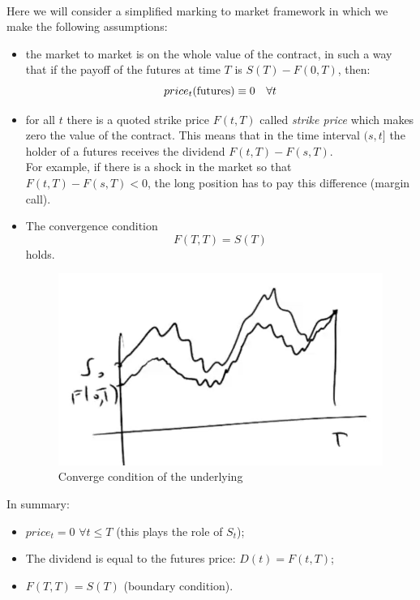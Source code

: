 \\
Here we will consider a simplified marking to market framework in which we make the following assumptions:
\begin{itemize}
    \item the market to market is on the whole value of the contract, in such a way that if the payoff of the futures at time $T$ is $S(T)-F(0,T)$, then:
    \begin{equation*}
        price_t(\operatorname{futures}) \equiv 0 \quad\forall t
    \end{equation*} %
    \item for all $t$ there is a quoted strike price $F(t,T)$ called \emph{strike price} which makes zero the value of the contract. This means that in the time interval $(s,t]$ the holder of a futures receives the dividend $F(t,T) - F(s,T)$.\\
    For example, if there is a shock in the market so that $F(t,T) - F(s,T) < 0$, the long position has to pay this difference (margin call).
    \item The convergence condition
    \begin{equation}
        F(T,T) = S(T)
    \end{equation}
    holds.
    \begin{figure}[h]
        \centering
        \includegraphics[scale=0.32]{fig/tmp/fig32.png}
        \caption{Converge condition of the underlying}
        \label{fig:concond}
    \end{figure}
\end{itemize}
In summary:
\begin{itemize}
    \item $price_t = 0$ $\forall t\le T$ (this plays the role of $S_t$);
    \item The dividend is equal to the futures price: $D(t)=F(t,T)$;
    \item $F(T,T)=S(T)$ (boundary condition).
\end{itemize}
